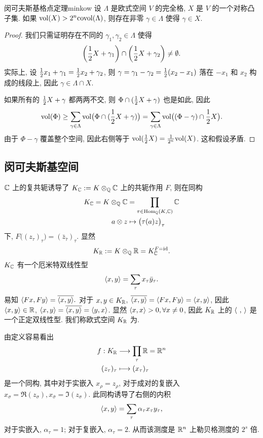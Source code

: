 \begin{theorem}{闵可夫斯基格点定理}{minkow}
设 $\Lambda$ 是欧式空间 $V$ 的完全格, $X$ 是 $V$ 的一个对称凸子集. 如果 ${\mathrm{vol}}(X)>2^n{\mathrm{covol}}(\Lambda)$, 则存在非零 $\gamma\in\Lambda$ 使得 $\gamma\in X$.
\end{theorem}
\begin{proof}
我们只需证明存在不同的 $\gamma_1,\gamma_2\in\Lambda$ 使得
  \[\left(\frac{1}{2} X+\gamma_1\right)\cap \left(\frac{1}{2} X+\gamma_2\right)\neq \emptyset.\]
实际上, 设 $\frac{1}{2} x_1+\gamma_1=\frac{1}{2} x_2+\gamma_2$, 则 $\gamma=\gamma_1-\gamma_2=\frac{1}{2}(x_2-x_1)$ 落在 $-x_1$ 和 $x_2$ 构成的线段上, 因此 $\gamma\in \Lambda\cap X$.

如果所有的 $\frac{1}{2} X+\gamma$ 都两两不交, 则 $\Phi\cap (\frac{1}{2} X+\gamma)$ 也是如此, 因此
  \[{\mathrm{vol}}(\Phi)\ge \sum_{\gamma\in \Lambda} {\mathrm{vol}}\bigl(\Phi\cap (\frac{1}{2} X+\gamma)\bigr)=\sum_{\gamma\in \Lambda} {\mathrm{vol}}\bigl((\Phi-\gamma)\cap \frac{1}{2} X\bigr).\]
由于 $\Phi-\gamma$ 覆盖整个空间, 因此右侧等于 ${\mathrm{vol}}(\frac{1}{2} X)=\frac{1}{2^n}{\mathrm{vol}}(X)$. 这和假设矛盾.
\end{proof}


\subsection{闵可夫斯基空间}
${\mathbb{C}}$ 上的复共轭诱导了 $K_{\mathbb{C}}:=K\otimes_{\mathbb{Q}} {\mathbb{C}}$ 上的共轭作用 $F$, 则在同构
  \[\begin{split}
	K_{\mathbb{C}}=K\otimes_{\mathbb{Q}} {\mathbb{C}}&=\prod_{\tau\in{\mathrm{Hom}}_{\mathbb{Q}}(K,{\mathbb{C}})} {\mathbb{C}}\\
	a\otimes z&\mapsto \bigl(\tau(a)z\bigr)_\tau
	\end{split}\]
下, $F\bigl((z_\tau)_\tau\bigr)=(\bar z_{\bar \tau})_\tau$. 显然
  \[K_{\mathbb{R}}:=K\otimes_{\mathbb{Q}} {\mathbb{R}}=K_{\mathbb{C}}^{F={\mathrm{id}}}.\]
$K_{\mathbb{C}}$ 有一个厄米特双线性型
  \[\langle{x,y}\rangle=\sum_\tau x_\tau\bar y_\tau.\]
易知 $\langle{Fx,Fy}\rangle=\overline{\langle{x,y}\rangle}.$ 对于 $x,y\in K_{\mathbb{R}}$, $\overline{\langle{x,y}\rangle}=\langle{Fx,Fy}\rangle=\langle{x,y}\rangle$, 因此 $\langle{x,y}\rangle\in{\mathbb{R}}$, $\langle{x,y}\rangle=\overline{\langle{x,y}\rangle}=\langle{y,x}\rangle$. 显然 $\langle{x,x}\rangle>0,\forall x\neq 0$, 因此 $K_{\mathbb{R}}$ 上的 $\langle{~,~}\rangle$ 是一个正定双线性型. 我们称欧式空间 $K_{\mathbb{R}}$ 为. 

由定义容易看出
\begin{equation}\label{eq:minkow_iso}
  \begin{split}f: K_{\mathbb{R}} &\longrightarrow \prod_\tau {\mathbb{R}}={\mathbb{R}}^n \\ (z_\tau)_\tau &\longmapsto (x_\tau)_\tau\end{split}
\end{equation}
是一个同构, 其中对于实嵌入 $x_\rho=z_\rho$, 对于成对的复嵌入 $x_\sigma=\Re(z_\sigma),x_{\bar \sigma}=\Im(z_\sigma)$.
此同构诱导了右侧的内积
\begin{equation}\label{eq:tau}
  \langle{x,y}\rangle=\sum_{\tau} \alpha_\tau x_\tau y_\tau,
\end{equation}
对于实嵌入, $\alpha_\tau=1$; 对于复嵌入, $\alpha_\tau=2$.
从而该测度是 ${\mathbb{R}}^n$ 上勒贝格测度的 $2^s$ 倍.


